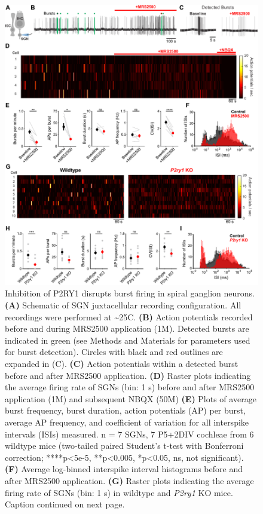 \documentclass[9pt,lineno]{elife}
\begin{document}
\begin{figure}
\begin{fullwidth}
\includegraphics[width=.95\linewidth]{figures/Fig6.pdf}
\caption{Inhibition of P2RY1 disrupts burst firing in spiral ganglion neurons.
\textbf{(A)} Schematic of SGN juxtacellular recording configuration. All recordings were performed at \textasciitilde 25\textdegree C.
\textbf{(B)} Action potentials recorded before and during MRS2500 application (1\textmu M). Detected bursts are indicated in green (see Methods and Materials for parameters used for burst detection). Circles with black and red outlines are expanded in (C).
\textbf{(C)} Action potentials within a detected burst before and after MRS2500 application.
\textbf{(D)} Raster plots indicating the average firing rate of SGNs (bin: 1 s) before and after MRS2500 application (1\textmu M) and subsequent NBQX (50\textmu M)
\textbf{(E)} Plots of average burst frequency, burst duration, action potentials (AP) per burst, average AP frequency, and coefficient of variation for all interspike intervals (ISIs) measured. n = 7 SGNs, 7 P5+2DIV cochleae from 6 wildtype mice (two-tailed paired Student's t-test with Bonferroni correction; ****p<5e-5, **p<0.005, *p<0.05, ns, not significant).
\textbf{(F)} Average log-binned interspike interval histograms before and after MRS2500 application.
\textbf{(G)} Raster plots indicating the average firing rate of SGNs (bin: 1 s) in wildtype and \textit{P2ry1} KO mice. Caption continued on next page.
}
\label{fig:f6}
\end{fullwidth}
\end{figure}
\end{document}
